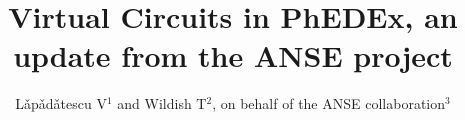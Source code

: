 \documentclass[a4paper]{jpconf}
\begin{document}
\title{Virtual Circuits in PhEDEx, an update from the ANSE project}

\author{L\v{a}p\v{a}d\v{a}tescu V$^1$ and Wildish T$^2$, on behalf of the ANSE collaboration$^3$}

\address{$^1$ Caltech, USA}
\address{$^2$ Princeton University, USA}
\address{B. Ball, A. Barczyk, J. Batista, K. De, S. McKee, A. Melo, H. Newman, A. Petrosyan, P. Sheldon, R. Voicu}




% 
% 
% 

\par

\end{document}
